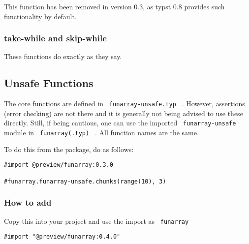 This function has been removed in version 0.3, as typst 0.8 provides
such functionality by default.

\subsubsection{take-while and
skip-while}\label{take-while-and-skip-while}

These functions do exactly as they say.

\begin{Shaded}
\begin{Highlighting}[]
\end{Highlighting}
\end{Shaded}

\subsection{Unsafe Functions}\label{unsafe-functions}

The core functions are defined in \texttt{\ funarray-unsafe.typ\ } .
However, assertions (error checking) are not there and it is generally
not being advised to use these directly. Still, if being cautious, one
can use the imported \texttt{\ funarray-unsafe\ } module in
\texttt{\ funarray(.typ)\ } . All function names are the same.

To do this from the package, do as follows:

\begin{verbatim}
#import @preview/funarray:0.3.0

#funarray.funarray-unsafe.chunks(range(10), 3)
\end{verbatim}

\subsubsection{How to add}\label{how-to-add}

Copy this into your project and use the import as \texttt{\ funarray\ }

\begin{verbatim}
#import "@preview/funarray:0.4.0"
\end{verbatim}



